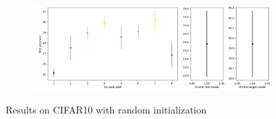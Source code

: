 \documentclass{article}
\begin{document}
\begin{figure}[htbp]
    \vspace{0.5cm}
    
    \begin{subfigure}[b]{0.5\textwidth}
        \centering
        \includegraphics[width=\textwidth]{imgs/statistical_reliability_CIFAR10_random_2024_05_02_15_49_40.png}
    \end{subfigure}
    \caption{Results on CIFAR10 with random initialization}
\end{figure}
\end{document}
